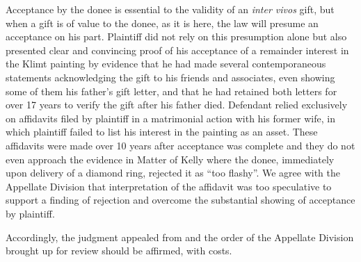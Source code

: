 
Acceptance by the donee is essential to the validity of an \textit{inter vivos}
gift, but when a gift is of value to the donee, as it is here, the law will
presume an acceptance on his part. Plaintiff did not rely on this presumption
alone but also presented clear and convincing proof of his acceptance of a
remainder interest in the Klimt painting by evidence that he had made several
contemporaneous statements acknowledging the gift to his friends and
associates, even showing some of them his father's gift letter, and that he had
retained both letters for over 17 years to verify the gift after his father
died. Defendant relied exclusively on affidavits filed by plaintiff in a
matrimonial action with his former wife, in which plaintiff failed to list his
interest in the painting as an asset. These affidavits were made over 10 years
after acceptance was complete and they do not even approach the evidence in
Matter of Kelly where the donee, immediately upon delivery of a diamond ring,
rejected it as ``too flashy''. We agree with the Appellate Division that
interpretation of the affidavit was too speculative to support a finding of
rejection and overcome the substantial showing of acceptance by plaintiff.

 Accordingly, the judgment appealed from and the order of the Appellate Division
brought up for review should be affirmed, with costs.

